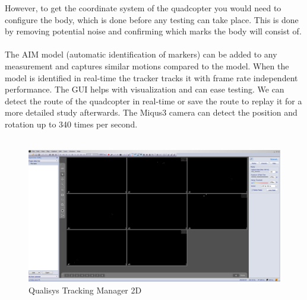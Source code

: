 \noindent However, to get the coordinate system of the quadcopter you would need to configure the body, which is done before any testing can take place. This is done by removing potential noise and confirming which marks the body will consist of. 
\\\\
The AIM model (automatic identification of markers) can be added to any measurement and captures similar motions compared to the model. When the model is identified in real-time the tracker tracks it with frame rate independent performance. The GUI helps with visualization and can ease testing. We can detect the route of the quadcopter in real-time or save the route to replay it for a more detailed study afterwards.  The Miqus3 camera can detect the position and rotation up to 340 times per second. \\\\
\begin{figure}[h]
          \centering
            \includegraphics[scale = 0.25]{VAPIQ-PICTURES/qtm2d.png}
                \caption{Qualisys Tracking Manager 2D}
                \label{qtm2d}
            \label{dir}
\end{figure}
\\\\
